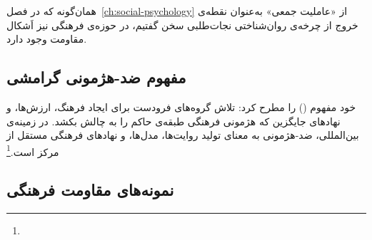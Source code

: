 همان‌گونه که در فصل~\ref{ch:social-psychology} از «عاملیت جمعی» به‌عنوان نقطه‌ی خروج از چرخه‌ی روان‌شناختی نجات‌طلبی سخن گفتیم، در حوزه‌ی فرهنگی نیز اَشکال مقاومت وجود دارد.

\subsection{مفهوم ضد-هژمونی گرامشی}
\label{subsec:ch13-counter-hegemony}

 خود مفهوم  () را مطرح کرد: تلاش گروه‌های فرودست برای ایجاد فرهنگ، ارزش‌ها، و نهادهای جایگزین که هژمونی فرهنگی طبقه‌ی حاکم را به چالش بکشد. در زمینه‌ی بین‌المللی، ضد-هژمونی به معنای تولید روایت‌ها، مدل‌ها، و نهادهای فرهنگی مستقل از مرکز است.\footnote{}

\subsection{نمونه‌های مقاومت فرهنگی}
\label{subsec:ch13-cultural-resistance}

